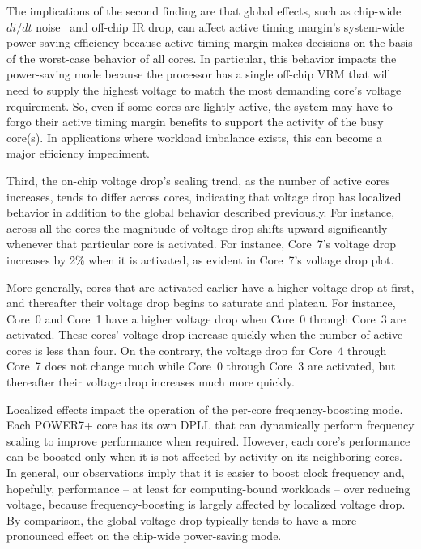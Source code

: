 The implications of the second finding are that global effects, such as chip-wide $di/dt$ noise~\cite{gupta2007understanding,miller2012vrsync,bertran2014voltage} and off-chip IR drop, can affect active timing margin's system-wide power-saving efficiency because active timing margin makes decisions on the basis of the worst-case behavior of all cores. In particular, this behavior impacts the power-saving mode because the processor has a single off-chip VRM that will need to supply the highest voltage to match the most demanding core's voltage requirement. So, even if some cores are lightly active, the system may have to forgo their active timing margin benefits to support the activity of the busy core(s). In applications where workload imbalance exists, this can become a major efficiency impediment. 

Third, the on-chip voltage drop's scaling trend, as the number of active cores increases, tends to differ across cores, indicating that voltage drop has localized behavior in addition to the global behavior described previously. For instance, across all the cores the magnitude of voltage drop shifts upward significantly whenever that particular core is activated. For instance, Core~7's voltage drop increases by 2\% when it is activated, as evident in Core~7's voltage drop plot.

More generally, cores that are activated earlier have a higher voltage drop at first, and thereafter their voltage drop begins to saturate and plateau. For instance, Core~0 and Core~1 have a higher voltage drop when Core~0 through Core~3 are activated. These cores' voltage drop increase quickly when the number of active cores is less than four. On the contrary, the voltage drop for Core~4 through Core~7 does not change much while Core~0 through Core~3 are activated, but thereafter their voltage drop increases much more quickly.

Localized effects impact the operation of the per-core frequency-boosting mode. Each POWER7+ core has its own DPLL that can dynamically perform frequency scaling to improve performance when required. However, each core's performance can be boosted only when it is not affected by activity on its neighboring cores. In general, our observations imply that it is easier to boost clock frequency and, hopefully, performance -- at least for computing-bound workloads -- over reducing voltage, because frequency-boosting is largely affected by localized voltage drop. By comparison, the global voltage drop typically tends to have a more pronounced effect on the chip-wide power-saving mode. 

